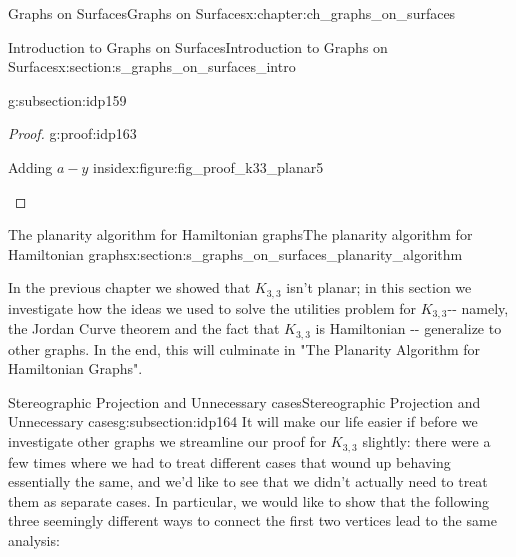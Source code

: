 \documentclass[oneside,10pt,]{book}
\numberwithin{equation}{section}
\begin{document}
\begin{chapterptx}{Graphs on Surfaces}{}{Graphs on Surfaces}{}{}{x:chapter:ch_graphs_on_surfaces}
\begin{sectionptx}{Introduction to Graphs on Surfaces}{}{Introduction to Graphs on Surfaces}{}{}{x:section:s_graphs_on_surfaces_intro}
\begin{subsectionptx}{}{}{}{}{}{g:subsection:idp159}
\begin{proof}{}{g:proof:idp163}
\begin{figureptx}{Adding \(a-y\) inside}{x:figure:fig_proof_k33_planar5}{}
\begin{image}{0.15}{0.7}{0.15}
{
}%
\end{image}%
\tcblower
\end{figureptx}%
\end{proof}
\end{subsectionptx}
\end{sectionptx}
%
%
\typeout{************************************************}
\typeout{************************************************}
%
\begin{sectionptx}{The planarity algorithm for Hamiltonian graphs}{}{The planarity algorithm for Hamiltonian graphs}{}{}{x:section:s_graphs_on_surfaces_planarity_algorithm}
\begin{introduction}{}%
In the previous chapter we showed that \(K_{3,3}\) isn't planar; in this section we investigate how the ideas we used to solve the utilities problem for \(K_{3,3}\)-{}-{} namely, the Jordan Curve theorem and the fact that \(K_{3,3}\) is Hamiltonian -{}-{} generalize to other graphs.  In the end, this will culminate in "The Planarity Algorithm for Hamiltonian Graphs".%
\end{introduction}%
%
%
\typeout{************************************************}
\typeout{************************************************}
%
\begin{subsectionptx}{Stereographic Projection and Unnecessary cases}{}{Stereographic Projection and Unnecessary cases}{}{}{g:subsection:idp164}
It will make our life easier if before we investigate other graphs we streamline our proof for \(K_{3,3}\) slightly: there were a few times where we had to treat different cases that wound up behaving essentially the same, and we'd like to see that we didn't actually need to treat them as separate cases.  In particular, we would like to show that the following three seemingly different ways to connect the first two vertices lead to the same analysis:%

\end{subsectionptx}
\end{sectionptx}
\end{chapterptx}
\end{document}
